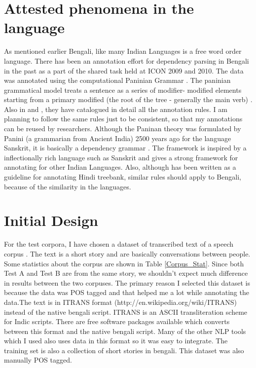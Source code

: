 \documentclass[11pt,letterpaper]{article}
\begin{document}
\section{Attested phenomena in the language}
As mentioned earlier Bengali, like many Indian Languages is a free word order language. There has been an annotation effort for dependency parsing in Bengali in the past as a part of the shared task held at ICON 2009 and 2010. The data was annotated using the computational Paninian Grammar \citep{Bharati}. The paninian grammatical model treats a sentence as a series of modifier- modified elements starting from a primary modified (the root of the tree - generally the main verb) \citep{Bharati-2009}. Also in \citep{Bharati-2009} and \citep{Begum-2008}, they have catalogued in detail all the annotation rules. I am planning to follow the same rules just to be consistent, so that my annotations can be reused by researchers. Although the Paninan theory was formulated by Panini (a grammarian from Ancient India) 2500 years ago for the language Sanskrit, it is basically a dependency grammar \citep{Kiparsky, Shastri}. The framework is inspired by a inflectionally rich language such as Sanskrit and gives a strong framework for annotating for other Indian Languages. Also, although \citep{Bharati-2009} has been written as a guideline for annotating Hindi treebank, similar rules should apply to Bengali, because of the similarity in the languages. 


\section{Initial Design}
For the test corpora, I have chosen a dataset of transcribed text of a speech corpus \citep{Shruti}. The text is a short story and are basically conversations between people. Some statistics about the corpus are shown in Table \ref{Corpus_Stat}. Since both Test A and Test B are from the same story, we shouldn't expect much difference in results between the two corpuses. The primary reason I selected this dataset is because the data was POS tagged and that helped me a lot while annotating the data.The text is in ITRANS format (http://en.wikipedia.org/wiki/ITRANS) instead of the native bengali script. ITRANS is an ASCII transliteration scheme for Indic scripts. There are free software packages available which converts between this format and the native bengali script. Many of the other NLP tools which I used also uses data in this format so it was easy to integrate. The training set is also a collection of short stories in bengali. This dataset was also manually POS tagged. 
\end{document}
